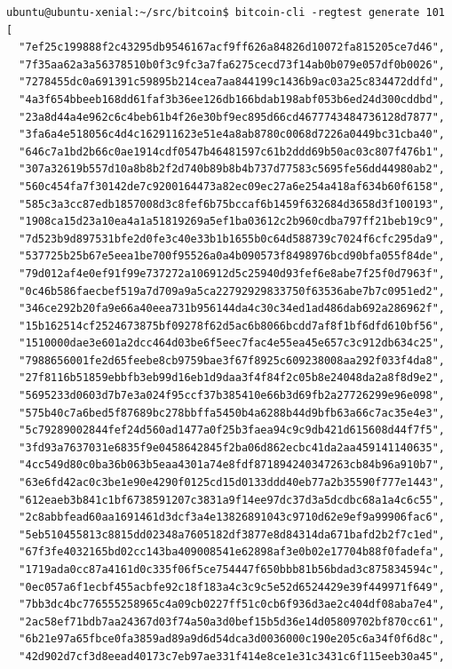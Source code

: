 \begin{verbatim}
ubuntu@ubuntu-xenial:~/src/bitcoin$ bitcoin-cli -regtest generate 101
[
  "7ef25c199888f2c43295db9546167acf9ff626a84826d10072fa815205ce7d46",
  "7f35aa62a3a56378510b0f3c9fc3a7fa6275cecd73f14ab0b079e057df0b0026",
  "7278455dc0a691391c59895b214cea7aa844199c1436b9ac03a25c834472ddfd",
  "4a3f654bbeeb168dd61faf3b36ee126db166bdab198abf053b6ed24d300cddbd",
  "23a8d44a4e962c6c4beb61b4f26e30bf9ec895d66cd4677743484736128d7877",
  "3fa6a4e518056c4d4c162911623e51e4a8ab8780c0068d7226a0449bc31cba40",
  "646c7a1bd2b66c0ae1914cdf0547b46481597c61b2ddd69b50ac03c807f476b1",
  "307a32619b557d10a8b8b2f2d740b89b8b4b737d77583c5695fe56dd44980ab2",
  "560c454fa7f30142de7c9200164473a82ec09ec27a6e254a418af634b60f6158",
  "585c3a3cc87edb1857008d3c8fef6b75bccaf6b1459f632684d3658d3f100193",
  "1908ca15d23a10ea4a1a51819269a5ef1ba03612c2b960cdba797ff21beb19c9",
  "7d523b9d897531bfe2d0fe3c40e33b1b1655b0c64d588739c7024f6cfc295da9",
  "537725b25b67e5eea1be700f95526a0a4b090573f8498976bcd90bfa055f84de",
  "79d012af4e0ef91f99e737272a106912d5c25940d93fef6e8abe7f25f0d7963f",
  "0c46b586faecbef519a7d709a9a5ca22792929833750f63536abe7b7c0951ed2",
  "346ce292b20fa9e66a40eea731b956144da4c30c34ed1ad486dab692a286962f",
  "15b162514cf2524673875bf09278f62d5ac6b8066bcdd7af8f1bf6dfd610bf56",
  "1510000dae3e601a2dcc464d03be6f5eec7fac4e55ea45e657c3c912db634c25",
  "7988656001fe2d65feebe8cb9759bae3f67f8925c609238008aa292f033f4da8",
  "27f8116b51859ebbfb3eb99d16eb1d9daa3f4f84f2c05b8e24048da2a8f8d9e2",
  "5695233d0603d7b7e3a024f95ccf37b385410e66b3d69fb2a27726299e96e098",
  "575b40c7a6bed5f87689bc278bbffa5450b4a6288b44d9bfb63a66c7ac35e4e3",
  "5c79289002844fef24d560ad1477a0f25b3faea94c9c9db421d615608d44f7f5",
  "3fd93a7637031e6835f9e0458642845f2ba06d862ecbc41da2aa459141140635",
  "4cc549d80c0ba36b063b5eaa4301a74e8fdf871894240347263cb84b96a910b7",
  "63e6fd42ac0c3be1e90e4290f0125cd15d0133ddd40eb77a2b35590f777e1443",
  "612eaeb3b841c1bf6738591207c3831a9f14ee97dc37d3a5dcdbc68a1a4c6c55",
  "2c8abbfead60aa1691461d3dcf3a4e13826891043c9710d62e9ef9a99906fac6",
  "5eb510455813c8815dd02348a7605182df3877e8d84314da671bafd2b2f7c1ed",
  "67f3fe4032165bd02cc143ba409008541e62898af3e0b02e17704b88f0fadefa",
  "1719ada0cc87a4161d0c335f06f5ce754447f650bbb81b56bdad3c875834594c",
  "0ec057a6f1ecbf455acbfe92c18f183a4c3c9c5e52d6524429e39f449971f649",
  "7bb3dc4bc776555258965c4a09cb0227ff51c0cb6f936d3ae2c404df08aba7e4",
  "2ac58ef71bdb7aa24367d03f74a50a3d0bef15b5d36e14d05809702bf870cc61",
  "6b21e97a65fbce0fa3859ad89a9d6d54dca3d0036000c190e205c6a34f0f6d8c",
  "42d902d7cf3d8eead40173c7eb97ae331f414e8ce1e31c3431c6f115eeb30a45",

\end{verbatim}
